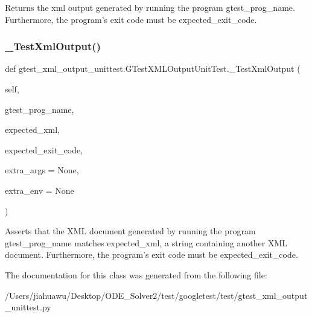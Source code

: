 \begin{DoxyVerb}Returns the xml output generated by running the program gtest_prog_name.
Furthermore, the program's exit code must be expected_exit_code.
\end{DoxyVerb}
 \mbox{\label{classgtest__xml__output__unittest_1_1_g_test_x_m_l_output_unit_test_a1d8a5fdd7e602fe31b1477f8ebc1e7f3}} 
\subsubsection{\texorpdfstring{\+\_\+\+Test\+Xml\+Output()}{\_TestXmlOutput()}}
{\footnotesize\ttfamily def gtest\+\_\+xml\+\_\+output\+\_\+unittest.\+G\+Test\+X\+M\+L\+Output\+Unit\+Test.\+\_\+\+Test\+Xml\+Output (\begin{DoxyParamCaption}\item[{}]{self,  }\item[{}]{gtest\+\_\+prog\+\_\+name,  }\item[{}]{expected\+\_\+xml,  }\item[{}]{expected\+\_\+exit\+\_\+code,  }\item[{}]{extra\+\_\+args = {\ttfamily None},  }\item[{}]{extra\+\_\+env = {\ttfamily None} }\end{DoxyParamCaption})\hspace{0.3cm}{\ttfamily [private]}}

\begin{DoxyVerb}Asserts that the XML document generated by running the program
gtest_prog_name matches expected_xml, a string containing another
XML document.  Furthermore, the program's exit code must be
expected_exit_code.
\end{DoxyVerb}
 

The documentation for this class was generated from the following file\+:\begin{DoxyCompactItemize}
\item 
/\+Users/jiahuawu/\+Desktop/\+O\+D\+E\+\_\+\+Solver2/test/googletest/test/gtest\+\_\+xml\+\_\+output\+\_\+unittest.\+py\end{DoxyCompactItemize}
